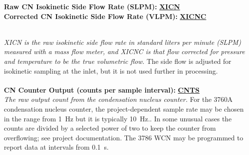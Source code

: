 \begin{hangparagraphs}
\noindent\begin{minipage}[t]{1\columnwidth}%
\textbf{Raw CN Isokinetic Side Flow Rate (SLPM):}\hypertarget{XICN}{}\textbf{
}\textbf{\uline{XICN}}\\
\textbf{Corrected CN Isokinetic Side Flow Rate (VLPM):}\hypertarget{XICNC}{}\textbf{
}\textbf{\uline{XICNC}}\textbf{\uline{}}%
\end{minipage}\\
\emph{XICN is the raw isokinetic side flow rate in standard liters
per minute (SLPM) measured with a mass flow meter, and XICNC is that
flow corrected for pressure and temperature to be the true volumetric
flow.} The side flow is adjusted for
isokinetic sampling at the inlet, but it is not used further in processing.
\\
\\

\textbf{CN Counter Output (counts per sample interval):}\hypertarget{CNTS}{}\textbf{
}\textbf{\uline{CNTS}}\\
\emph{The raw output count from the condensation nucleus counter.}
For the 3760A condensation nucleus counter, the project-dependent
sample rate may be chosen in the range from 1~Hz but
it is typically 10~Hz.. In some unusual cases the counts are divided
by a selected power of two to keep the counter from overflowing; see
project documentation. The 3786 WCN may be programmed to report data
at intervals from 0.1~s.\label{punch:7-1}


\end{hangparagraphs}
